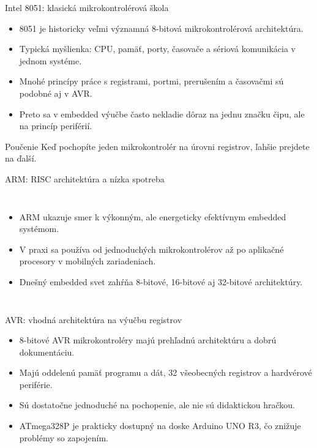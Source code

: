 \begin{frame}{Intel 8051: klasická mikrokontrolérová škola}
\begin{itemize}
  \item 8051 je historicky veľmi významná 8-bitová mikrokontrolérová architektúra.
  \item Typická myšlienka: CPU, pamäť, porty, časovače a sériová komunikácia v jednom systéme.
  \item Mnohé princípy práce s registrami, portmi, prerušením a časovačmi sú podobné aj v AVR.
  \item Preto sa v embedded výučbe často nekladie dôraz na jednu značku čipu, ale na princíp periférií.
\end{itemize}
\begin{alertblock}{Poučenie}
Keď pochopíte jeden mikrokontrolér na úrovni registrov, ľahšie prejdete na ďalší.
\end{alertblock}
\end{frame}

\begin{frame}{ARM: RISC architektúra a nízka spotreba}
\begin{columns}[T,onlytextwidth]
\begin{itemize}
  \item ARM ukazuje smer k výkonným, ale energeticky efektívnym embedded systémom.
  \item V praxi sa používa od jednoduchých mikrokontrolérov až po aplikačné procesory v mobilných zariadeniach.
  \item Dnešný embedded svet zahŕňa 8-bitové, 16-bitové aj 32-bitové architektúry.
\end{itemize}
\end{columns}
\end{frame}

\begin{frame}{AVR: vhodná architektúra na výučbu registrov}
\begin{itemize}
  \item 8-bitové AVR mikrokontroléry majú prehľadnú architektúru a dobrú dokumentáciu.
  \item Majú oddelenú pamäť programu a dát, 32 všeobecných registrov a hardvérové periférie.
  \item Sú dostatočne jednoduché na pochopenie, ale nie sú didaktickou hračkou.
  \item ATmega328P je prakticky dostupný na doske Arduino UNO R3, čo znižuje problémy so zapojením.
\end{itemize}
\end{frame}

